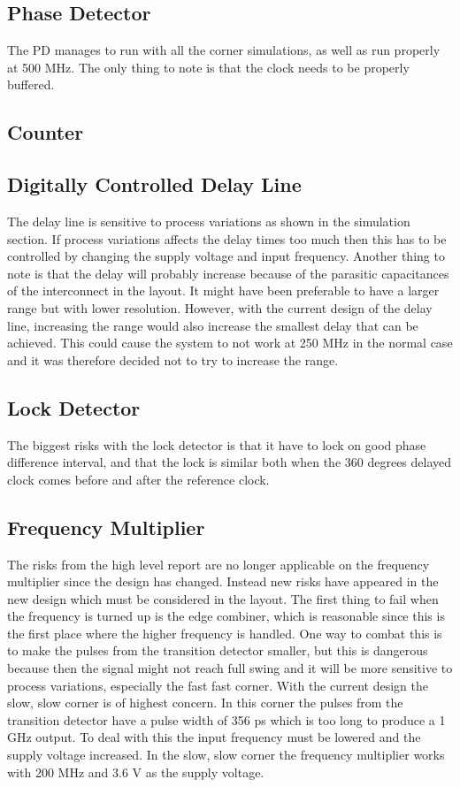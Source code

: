 \documentclass[a4paper,12pt]{article} \usepackage{graphicx}
\begin{document}
\subsection{Phase Detector}
The PD manages to run with all the corner simulations, as well as run properly
at 500 MHz. The only thing to note is that the clock needs to be properly buffered.

\subsection{Counter}


\subsection{Digitally Controlled Delay Line}
The delay line is sensitive to process variations as shown in the simulation
section. If process variations affects the delay times too much then this has to
be controlled by changing the supply voltage and input frequency. Another thing
to note is that the delay will probably increase because of the parasitic capacitances of
the interconnect in the layout. It might have been preferable to have a larger
range but with lower resolution. However, with the current design of the delay
line, increasing the range would also increase the smallest delay that can be
achieved. This could cause the system to not work at 250 MHz in the normal case
and it was therefore decided not to try to increase the range. 
\subsection{Lock Detector}
The biggest risks with the lock detector is that it have to lock on
good phase difference interval, and that the lock is similar both when
the 360 degrees delayed clock comes before and after the reference
clock. 
\subsection{Frequency Multiplier}
The risks from the high level report are no longer applicable on the frequency
multiplier since the design has changed. Instead new risks have appeared in the
new design which must be considered in the layout. The first thing to fail when
the frequency is turned up is the edge combiner, which is reasonable since this
is the first place where the higher frequency is handled. One way to combat this
is to make the pulses from the transition detector smaller, but this is
dangerous because then the signal might not reach full swing and it will be more
sensitive to process variations, especially the fast fast corner. With the
current design the slow, slow corner is of highest concern. In this corner the
pulses from the transition detector have a pulse width of 356 ps which is too
long to produce a 1 GHz output. To deal with this the input frequency must be
lowered and the supply voltage increased. In the slow, slow corner the frequency
multiplier works with 200 MHz and 3.6 V as the supply voltage.
\end{document}
